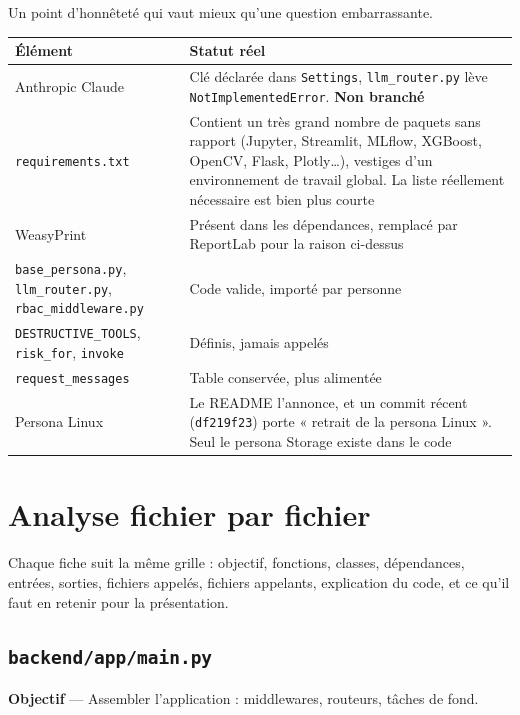 \documentclass[11pt,a4paper]{report}
\newcommand{\file}[1]{\texttt{\small #1}}
\newcommand{\fn}[1]{\texttt{\small\textcolor{oasisviolet}{#1}}}
\newcommand{\cls}[1]{\texttt{\small\textcolor{oasisblue}{#1}}}
\newcommand{\tbl}[1]{\texttt{\small\textcolor{oasisamber}{#1}}}
\begin{document}
Un point d'honnêteté qui vaut mieux qu'une question embarrassante.

\begin{longtable}{@{}p{3.6cm}p{11.2cm}@{}}
\toprule
\textbf{Élément} & \textbf{Statut réel}\\
\midrule
\endhead
Anthropic Claude & Clé déclarée dans \cls{Settings}, \file{llm\_router.py} lève \texttt{NotImplementedError}. \textbf{Non branché}\\
\file{requirements.txt} & Contient un très grand nombre de paquets sans rapport (Jupyter, Streamlit, MLflow, XGBoost, OpenCV, Flask, Plotly\ldots), vestiges d'un environnement de travail global. La liste réellement nécessaire est bien plus courte\\
WeasyPrint & Présent dans les dépendances, remplacé par ReportLab pour la raison ci-dessus\\
\file{base\_persona.py}, \file{llm\_router.py}, \file{rbac\_middleware.py} & Code valide, importé par personne\\
\texttt{DESTRUCTIVE\_TOOLS}, \fn{risk\_for}, \fn{invoke} & Définis, jamais appelés\\
\tbl{request\_messages} & Table conservée, plus alimentée\\
Persona Linux & Le README l'annonce, et un commit récent (\texttt{df219f23}) porte « retrait de la persona Linux ». Seul le persona Storage existe dans le code\\
\bottomrule
\end{longtable}

\chapter{Analyse fichier par fichier}
\label{ch:fichiers}

Chaque fiche suit la même grille : objectif, fonctions, classes, dépendances,
entrées, sorties, fichiers appelés, fichiers appelants, explication du code, et
ce qu'il faut en retenir pour la présentation.

\section{\file{backend/app/main.py}}

\textbf{Objectif} --- Assembler l'application : middlewares, routeurs, tâches de
fond.
\end{document}
